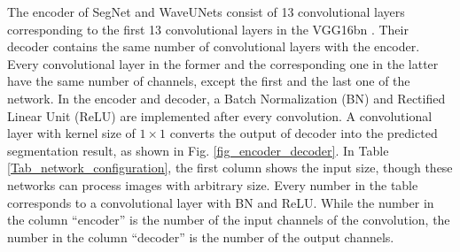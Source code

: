 \begin{table}[!t]
	\caption{Deep network configurations.}
	\label{Tab_network_configuration}
	\begin{center}
	\begin{threeparttable}
	\end{threeparttable}
	\end{center}
\end{table}
The encoder of SegNet and WaveUNets consist of 13 convolutional layers
corresponding to the first 13 convolutional layers in the VGG16bn \cite{simonyan2014very}.
Their decoder contains the same number of convolutional layers with the encoder.
Every convolutional layer in the former and the corresponding one in the latter have the same number of channels,
except the first and the last one of the network.
In the encoder and decoder, a Batch Normalization (BN) and Rectified Linear Unit (ReLU) are implemented after every convolution.
A convolutional layer with kernel size of $1\times1$ converts the output of decoder into the predicted segmentation result,
as shown in Fig. \ref{fig_encoder_decoder}.
In Table \ref{Tab_network_configuration}, the first column shows the input size,
though these networks can process images with arbitrary size.
Every number in the table corresponds to a convolutional layer with BN and ReLU.
While the number in the column ``encoder'' is the number of the input channels of the convolution,
the number in the column ``decoder'' is the number of the output channels.

